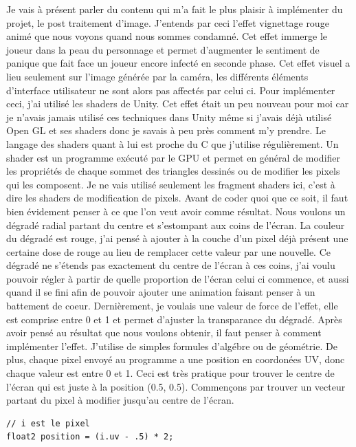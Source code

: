 \documentclass{article}
\begin{document}
Je vais à présent parler du contenu qui m'a fait le plus plaisir à implémenter du projet, le post traitement d'image. J'entends par ceci l'effet vignettage rouge animé que nous voyons quand nous sommes condamné. Cet effet immerge le joueur dans la peau du personnage et permet d'augmenter le sentiment de panique que fait face un joueur encore infecté en seconde phase. Cet effet visuel a lieu seulement sur l'image générée par la caméra, les différents éléments d'interface utilisateur ne sont alors pas affectés par celui ci.
Pour implémenter ceci, j'ai utilisé les shaders de Unity. Cet effet était un peu nouveau pour moi car je n'avais jamais utilisé ces techniques dans Unity même si j'avais déjà utilisé Open GL et ses shaders donc je savais à peu près comment m'y prendre. Le langage des shaders quant à lui est proche du C que j'utilise régulièrement. Un shader est un programme exécuté par le GPU et permet en général de modifier les propriétés de chaque sommet des triangles dessinés ou de modifier les pixels qui les composent. Je ne vais utilisé seulement les fragment shaders ici, c'est à dire les shaders de modification de pixels.
Avant de coder quoi que ce soit, il faut bien évidement penser à ce que l'on veut avoir comme résultat.
Nous voulons un dégradé radial partant du centre et s'estompant aux coins de l'écran. La couleur du dégradé est rouge, j'ai pensé à ajouter à la couche d'un pixel déjà présent une certaine dose de rouge au lieu de remplacer cette valeur par une nouvelle. Ce dégradé ne s'étends pas exactement du centre de l'écran à ces coins, j'ai voulu pouvoir régler à partir de quelle proportion de l'écran celui ci commence, et aussi quand il se fini afin de pouvoir ajouter une animation faisant penser à un battement de coeur. Dernièrement, je voulais une valeur de force de l'effet, elle est comprise entre 0 et 1 et permet d'ajuster la transparance du dégradé.
Après avoir pensé au résultat que nous voulons obtenir, il faut penser à comment implémenter l'effet. J'utilise de simples formules d'algébre ou de géométrie. De plus, chaque pixel envoyé au programme a une position en coordonées UV, donc chaque valeur est entre 0 et 1. Ceci est très pratique pour trouver le centre de l'écran qui est juste à la position (0.5, 0.5).
Commençons par trouver un vecteur partant du pixel à modifier jusqu'au centre de l'écran.

\begin{lstlisting}
// i est le pixel
float2 position = (i.uv - .5) * 2;
\end{lstlisting}
\end{document}

